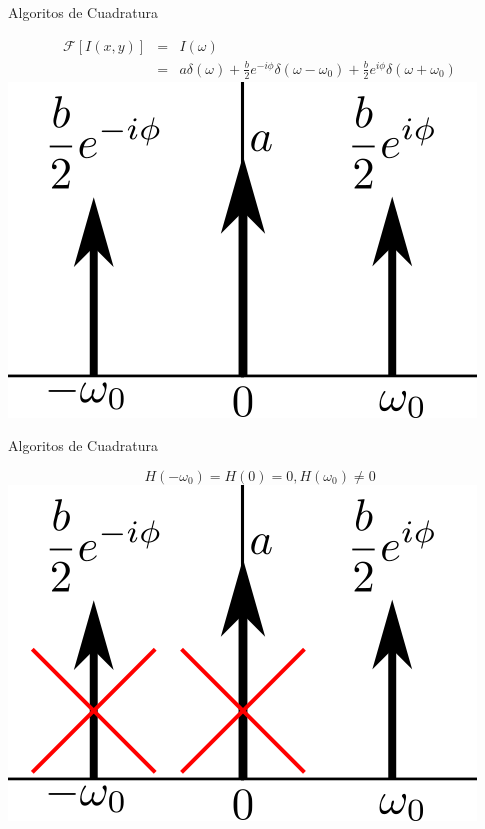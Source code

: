 \documentclass[]{beamer}
\begin{document}
\begin{frame}{Algoritos de Cuadratura}
\begin{center}

    \begin{eqnarray}
                      \mathcal{F}[I(x,y)] & = & I(\omega) \nonumber \\
                                                  & = & a\delta(\omega)+
                      \frac{b}{2}e^{-i \phi} \delta(\omega-\omega_0) +
                      \frac{b}{2} e^{i \phi} \delta(\omega+\omega_0)
    \end{eqnarray}
    \includegraphics[scale=0.6]{Images/FourierDomine1.png}

\end{center}
\end{frame}
\begin{frame}{Algoritos de Cuadratura}
\begin{center}

  \begin{equation}
            H(-\omega_0) =H(0) = 0, H(\omega_0) \neq 0
  \end{equation}
  \includegraphics[scale=0.6]{Images/FourierDomine2.png} 

\end{center}
\end{frame}
\end{document}
